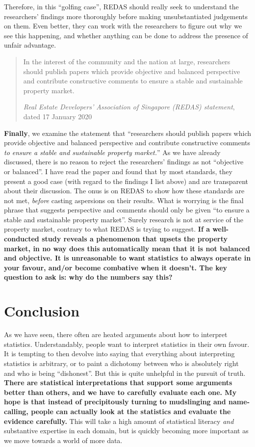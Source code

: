 \documentclass[
  openany]{book}
\begin{document}
Therefore, in this ``golfing case'', REDAS should really seek to understand the researchers' findings more thoroughly before making unsubstantiated judgements on them. Even better, they can work with the researchers to figure out why we see this happening, and whether anything can be done to address the presence of unfair advantage.

\begin{quote}
In the interest of the community and the nation at large, researchers should publish papers which provide objective and balanced perspective and contribute constructive comments to ensure a stable and sustainable property market.

\emph{Real Estate Developers' Association of Singapore (REDAS) statement}, dated 17 January 2020
\end{quote}

\textbf{Finally}, we examine the statement that ``researchers should publish papers which provide objective and balanced perspective and contribute constructive comments \emph{to ensure a stable and sustainable property market.}'' As we have already discussed, there is no reason to reject the researchers' findings as not ``objective or balanced''. I have read the paper and found that by most standards, they present a good case (with regard to the findings I list above) and are transparent about their discussion. The onus is on REDAS to show how these standards are not met, \emph{before} casting aspersions on their results. What is worrying is the final phrase that suggests perspective and comments should only be given ``to ensure a stable and sustainable property market''. Surely research is not at service of the property market, contrary to what REDAS is trying to suggest. \textbf{If a well-conducted study reveals a phenomenon that upsets the property market, in no way does this automatically mean that it is not balanced and objective. It is unreasonable to want statistics to always operate in your favour, and/or become combative when it doesn't. The key question to ask is: why do the numbers say this?}

\hypertarget{conclusion-4}{%
\section{Conclusion}\label{conclusion-4}}

As we have seen, there often are heated arguments about how to interpret statistics. Understandably, people want to interpret statistics in their own favour. It is tempting to then devolve into saying that everything about interpreting statistics is arbitrary, or to paint a dichotomy between who is absolutely right and who is being ``dishonest''. But this is quite unhelpful in the pursuit of truth. \textbf{There are statistical interpretations that support some arguments better than others, and we have to carefully evaluate each one. My hope is that instead of precipitously turning to mudslinging and name-calling, people can actually look at the statistics and evaluate the evidence carefully.} This will take a high amount of statistical literacy \emph{and} substantive expertise in each domain, but is quickly becoming more important as we move towards a world of more data.
\end{document}
